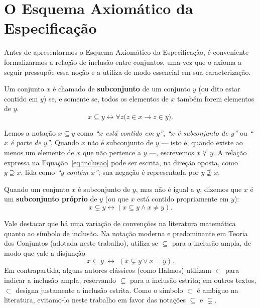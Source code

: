 \section{O Esquema Axiomático da Especificação}
\label{sec:axioma-separacao}

Antes de apresentarmos o Esquema Axiomático da Especificação, é conveniente formalizarmos a relação de inclusão entre conjuntos, uma vez que o axioma a seguir pressupõe essa noção e a utiliza de modo essencial em sua caracterização.

\begin{definicao}
\label{def:inclusao}
Um conjunto $x$ é chamado de \textbf{subconjunto} de um conjunto $y$ (ou dito estar contido em $y$) se, e somente se, todos os elementos de $x$ também forem elementos de $y$.
\begin{equation}\label{eq:inclusao}
    x \subseteq y \leftrightarrow \forall z \bigl(z \in x \rightarrow z \in y\bigr).
\end{equation}
\end{definicao}

Lemos a notação $x \subseteq y$ como \textit{``$x$ está contido em $y$''}, \textit{``$x$ é subconjunto de $y$''} ou \textit{``$x$ é parte de $y$''}. Quando $x$ não é subconjunto de $y$ — isto é, quando existe ao menos um elemento de $x$ que não pertence a $y$ —, escrevemos $x \nsubseteq y$. A relação expressa na Equação~\eqref{eq:inclusao} pode ser escrita, na direção oposta, como $y \supseteq x$, lida como \textit{``$y$ contém $x$''}; sua negação é representada por $y \nsupseteq x$.

Quando um conjunto $x$ é subconjunto de $y$, mas não é igual a $y$, dizemos que $x$ é um \textbf{subconjunto próprio} de $y$ (ou que $x$ está contido propriamente em $y$):
\begin{equation}\label{eq:subconjunto-proprio}
    x \subsetneq y \leftrightarrow (x \subseteq y \land x \neq y).
\end{equation}

Vale destacar que há uma variação de convenções na literatura matemática quanto ao símbolo de inclusão. Na notação moderna e predominante em Teoria dos Conjuntos (adotada neste trabalho), utiliza-se $\subseteq$ para a inclusão ampla, de modo que vale a disjunção
\begin{equation*}
    x \subseteq y \;\leftrightarrow\; (x \subsetneq y \lor x = y).
\end{equation*}
Em contrapartida, alguns autores clássicos (como Halmos) utilizam $\subset$ para indicar a inclusão ampla, reservando $\subsetneq$ para a inclusão estrita; em outros textos, $\subset$ designa justamente a inclusão estrita. Como o símbolo $\subset$ é ambíguo na literatura, evitamo-lo neste trabalho em favor das notações $\subseteq$ e $\subsetneq$.

